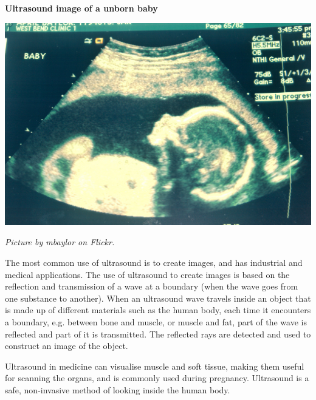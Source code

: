 \begin{minipage}{.5\textwidth}
\begin{center}
\textbf{Ultrasound image of a unborn baby}\par
\includegraphics[width=.8\columnwidth]{photos/ultrasound_mbaylor_flickr.jpg}
\par\textit{Picture by mbaylor on Flickr.}
\end{center}
\end{minipage}
\begin{minipage}{.5\textwidth}
      \label{m38800*id185140}The most common use of ultrasound is to create images, and has industrial and medical applications. The use of ultrasound to create images is based on the reflection and transmission of a wave at a boundary (when the wave goes from one substance to another). When an ultrasound wave travels inside an object that is made up of different materials such as the human body, each time it encounters a boundary, e.g. between bone and muscle, or muscle and fat, part of the wave is reflected and part of it is transmitted. The reflected rays are detected and used to construct an image of the object.\par 
      \label{m38800*id185148}Ultrasound in medicine can visualise muscle and soft tissue, making them useful for scanning the organs, and is commonly used during pregnancy. Ultrasound is a safe, non-invasive method of looking inside the human body.\par 
      
\end{minipage}

